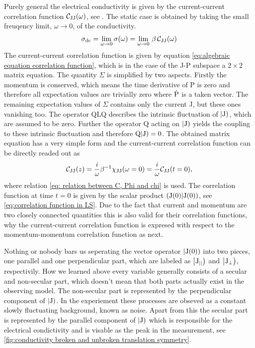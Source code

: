 Purely general the electrical conductivity is given by the current-current correlation function $\mathcal{C}_{\mathrm{JJ}}(\omega)$, see \cite{Chycholl2}.
The static case is obtained by taking the small freuqency limit, $\omega \to 0$, of the conductivity.
%
\begin{align}
	\sigma_{\mathrm{dc}} = \lim\limits_{\omega \to 0} \sigma(\omega) = \lim\limits_{\omega \to 0}\, \beta\,\mathcal{C}_{\mathrm{JJ}}(\omega)
	\label{eq:general static condictivity}
\end{align}
%
The current-current correlation function is given by equation \eqref{eq:algebraic equation correlation function}, which is in the case of the J-P subspace a $2\times2$ matrix equation.
The quantity $\Sigma$ is simplified by two aspects.
Firstly the momentum is conserved, which means the time derivative of P is zero and therefore all expectation values are trivially zero where $\dot{\mathrm{P}}$ is a taken vector.
The remaining expectation values of $\Sigma$ contains only the current J, but these ones vanishing too.
The operator QLQ describes the intrinsic fluctuation of $|\mathrm{\mathrm{J}})$, which are assumed to be zero.
Further the operator Q acting on $|\mathrm{\mathrm{J}})$ yields the coupling to these intrinsic fluctuation and therefore $\mathrm{Q}|\mathrm{\mathrm{J}}) = 0$.
The obtained matrix equation has a very simple form and the current-current correlation function can be directly readed out as
%
\begin{align}
	\mathcal{C}_{\mathrm{JJ}}(z) = \frac{i}{\omega} \beta^{-1} \chi_{\mathrm{JJ}}(\omega=0) = \frac{i}{\omega} \mathcal{C}_{\mathrm{JJ}}(t=0),
	\label{eq:correlation function unpertubated system}
\end{align}
%
where relation \eqref{eq: relation between C, Phi and chi} is used.
The correlation function at time $t = 0$ is given by the scalar product $({\mathrm{J}(0)}|{\mathrm{J}(0)})$, see \eqref{eq:correlation function in LS}.
Due to the fact that current and momentum are two closely connected quantities this is also valid for their correlation functions, why the current-current correlation function is expresed with respect to the momentum-momentum correlation function as next.

Nothing or nobody bars us seperating the vector operator $|\mathrm{\mathrm{J}(0)})$ into two pieces, one parallel and one perpendicular part, which are labeled as $\big|{\mathrm{J}_{\mid\mid}}\big)$ and $\big|{\mathrm{J}_{\bot}}\big)$, respectivily.
How we learned above every variable generally consists of a secular and non-secular part, which doesn't mean that both parts actually exist in the observing model.
The non-secular part is represented by the perpendicular component of $|\mathrm{J})$.
In the experiement these processes are obseved as a constant slowly fluctuating background, known as noise.
Apart from this the secular part is represented by the parallel component of $|\mathrm{J})$ which is responsible for the electrical condictivity and is visable as the peak in the measurement, see \ref{fig:conductivity broken and unbroken translation symmetry}.

